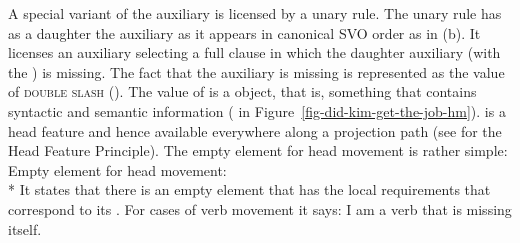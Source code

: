 \documentclass[output=paper,biblatex,babelshorthands,newtxmath,draftmode,colorlinks,citecolor=brown]{langscibook}
\begin{document}
\largerpage
A special variant of the auxiliary is licensed by a unary rule. The unary rule has as a daughter the auxiliary as
it appears in canonical SVO order as in (b). It licenses an auxiliary selecting a full clause
in which the daughter auxiliary (with the \locv {}) is missing. The fact
that the auxiliary is missing is represented as the value of \textsc{double slash} (\dsl). The value of \dsl is a
 object, that is, something that contains syntactic and semantic information (
in Figure~\ref{fig-did-kim-get-the-job-hm}). \dsl is a head feature and hence available everywhere
along a projection path (see \crossrefchaptert[\page \pageref{page-hfp}]{properties} for the Head Feature
Principle). The empty element for head movement is rather simple:
\ea
Empty element for head movement:\\*
\z
It states that there is an empty element that has the local requirements that correspond to its
\dslv. For cases of verb movement it says: I am a verb that is missing itself. 
\end{document}
